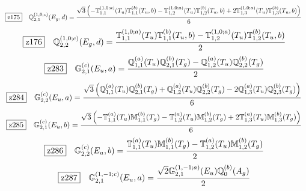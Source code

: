 \documentclass[fleqn,10pt,landscape]{jsarticle}
\begin{document}
\begin{dmath*}
\hspace*{3mm}\fbox{z175}\quad \mathbb{Q}_{2,1}^{(1,0;c)}(E_{g},d)=\frac{\sqrt{3} \left(- \mathbb{T}_{1,1}^{(1,0;a)}(T_{u}) \mathbb{T}_{1,1}^{(b)}(T_{u},b) - \mathbb{T}_{1,2}^{(1,0;a)}(T_{u}) \mathbb{T}_{1,2}^{(b)}(T_{u},b) + 2 \mathbb{T}_{1,3}^{(1,0;a)}(T_{u}) \mathbb{T}_{1,3}^{(b)}(T_{u},b)\right)}{6}
\end{dmath*}
\begin{dmath*}
\hspace*{3mm}\fbox{z176}\quad \mathbb{Q}_{2,2}^{(1,0;c)}(E_{g},d)=\frac{\mathbb{T}_{1,1}^{(1,0;a)}(T_{u}) \mathbb{T}_{1,1}^{(b)}(T_{u},b) - \mathbb{T}_{1,2}^{(1,0;a)}(T_{u}) \mathbb{T}_{1,2}^{(b)}(T_{u},b)}{2}
\end{dmath*}
\begin{dmath*}
\hspace*{3mm}\fbox{z283}\quad \mathbb{G}_{2,1}^{(c)}(E_{u},a)=\frac{\mathbb{Q}_{1,1}^{(a)}(T_{u}) \mathbb{Q}_{2,1}^{(b)}(T_{g}) - \mathbb{Q}_{1,2}^{(a)}(T_{u}) \mathbb{Q}_{2,2}^{(b)}(T_{g})}{2}
\end{dmath*}
\begin{dmath*}
\hspace*{3mm}\fbox{z284}\quad \mathbb{G}_{2,2}^{(c)}(E_{u},a)=\frac{\sqrt{3} \left(\mathbb{Q}_{1,1}^{(a)}(T_{u}) \mathbb{Q}_{2,1}^{(b)}(T_{g}) + \mathbb{Q}_{1,2}^{(a)}(T_{u}) \mathbb{Q}_{2,2}^{(b)}(T_{g}) - 2 \mathbb{Q}_{1,3}^{(a)}(T_{u}) \mathbb{Q}_{2,3}^{(b)}(T_{g})\right)}{6}
\end{dmath*}
\begin{dmath*}
\hspace*{3mm}\fbox{z285}\quad \mathbb{G}_{2,1}^{(c)}(E_{u},b)=\frac{\sqrt{3} \left(- \mathbb{T}_{1,1}^{(a)}(T_{u}) \mathbb{M}_{1,1}^{(b)}(T_{g}) - \mathbb{T}_{1,2}^{(a)}(T_{u}) \mathbb{M}_{1,2}^{(b)}(T_{g}) + 2 \mathbb{T}_{1,3}^{(a)}(T_{u}) \mathbb{M}_{1,3}^{(b)}(T_{g})\right)}{6}
\end{dmath*}
\begin{dmath*}
\hspace*{3mm}\fbox{z286}\quad \mathbb{G}_{2,2}^{(c)}(E_{u},b)=\frac{\mathbb{T}_{1,1}^{(a)}(T_{u}) \mathbb{M}_{1,1}^{(b)}(T_{g}) - \mathbb{T}_{1,2}^{(a)}(T_{u}) \mathbb{M}_{1,2}^{(b)}(T_{g})}{2}
\end{dmath*}
\begin{dmath*}
\hspace*{3mm}\fbox{z287}\quad \mathbb{G}_{2,1}^{(1,-1;c)}(E_{u},a)=\frac{\sqrt{2} \mathbb{G}_{2,1}^{(1,-1;a)}(E_{u}) \mathbb{Q}_{0}^{(b)}(A_{g})}{2}
\end{dmath*}
\end{document}
